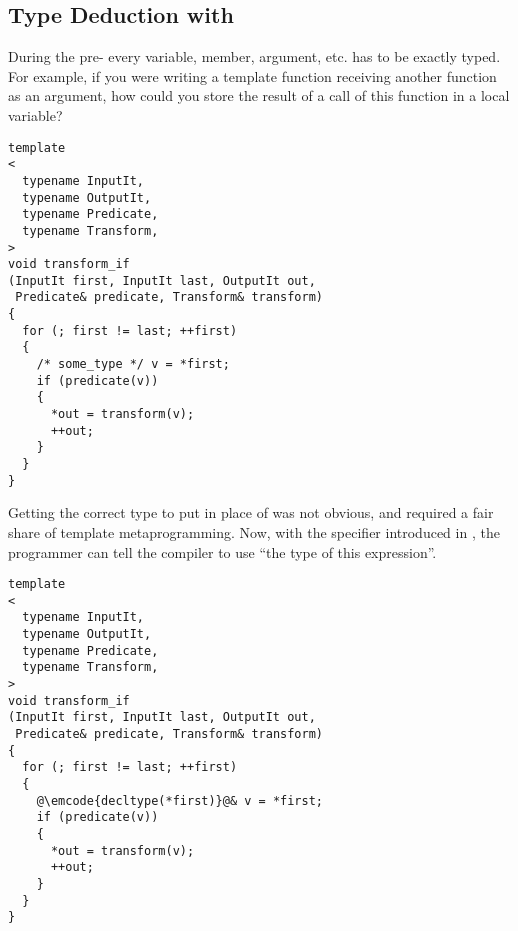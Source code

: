 \subsection{Type Deduction with }
\label{decltype}

During the pre- every variable, member, argument, etc. has to be
exactly typed. For example, if you were writing a template function
receiving another function as an argument, how could you store the
result of a call of this function in a local variable?

\begin{lstlisting}
template
<
  typename InputIt,
  typename OutputIt,
  typename Predicate,
  typename Transform,
>
void transform_if
(InputIt first, InputIt last, OutputIt out,
 Predicate& predicate, Transform& transform)
{
  for (; first != last; ++first)
  {
    /* some_type */ v = *first;
    if (predicate(v))
    {
      *out = transform(v);
      ++out;
    }
  }
}
\end{lstlisting}

Getting the correct type to put in place of  was not
obvious, and required a fair share of template metaprogramming. Now,
with the  specifier introduced in , the
programmer can tell the compiler to use ``the type of this
expression''.


\begin{lstlisting}
template
<
  typename InputIt,
  typename OutputIt,
  typename Predicate,
  typename Transform,
>
void transform_if
(InputIt first, InputIt last, OutputIt out,
 Predicate& predicate, Transform& transform)
{
  for (; first != last; ++first)
  {
    @\emcode{decltype(*first)}@& v = *first;
    if (predicate(v))
    {
      *out = transform(v);
      ++out;
    }
  }
}
\end{lstlisting}
